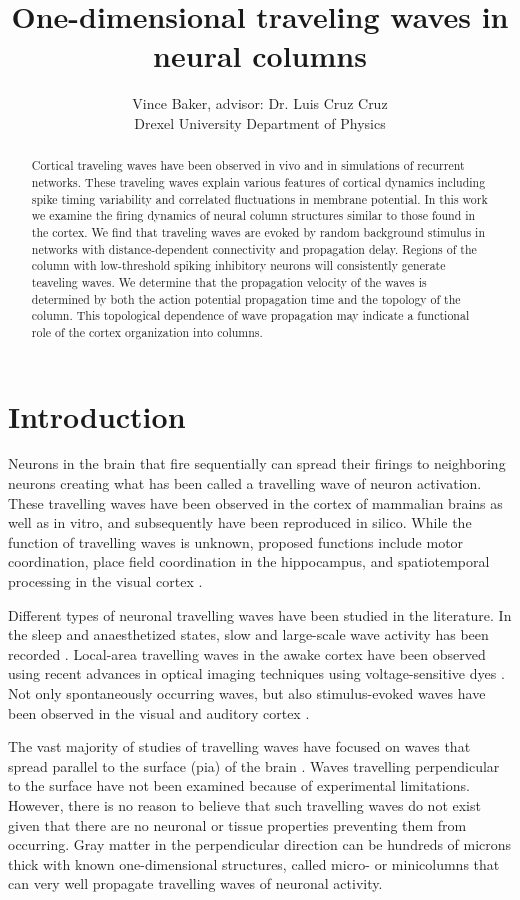 \documentclass[a4paper,11pt]{article}
\title{One-dimensional traveling waves in neural columns}
\author{Vince Baker, advisor: Dr. Luis Cruz Cruz\\ Drexel University Department of Physics}
\begin{document}
\maketitle

\begin{abstract}
Cortical traveling waves have been observed in vivo and in simulations of recurrent networks.
These traveling waves explain various features of cortical dynamics including spike timing variability and correlated fluctuations in membrane potential.
In this work we examine the firing dynamics of neural column structures similar to those found in the cortex.
We find that traveling waves are evoked by random background stimulus in networks with distance-dependent connectivity and propagation delay.
Regions of the column with low-threshold spiking inhibitory neurons will consistently generate teaveling waves.
We determine that the propagation velocity of the waves is determined by both the action potential propagation time and the topology of the column.
This topological dependence of wave propagation may indicate a functional role of the cortex organization into columns.

\end{abstract}

\section{Introduction} 
Neurons in the brain that fire sequentially can spread their firings to neighboring neurons creating what has been called a travelling wave of neuron activation. 
These travelling waves have been observed in the cortex of mammalian brains as well as in vitro, and subsequently have been reproduced in silico. 
While the function of travelling waves is unknown, proposed functions include motor coordination, place field coordination in the hippocampus, and spatiotemporal processing in the visual cortex \cite{muller2018}. 

Different types of neuronal travelling waves have been studied in the literature. 
In the sleep and anaesthetized states, slow and large-scale wave activity has been recorded \cite{muller2018}. 
Local-area travelling waves in the awake cortex have been observed using recent advances in optical imaging techniques using voltage-sensitive dyes \cite{wu2008}. 
Not only spontaneously occurring waves, but also stimulus-evoked waves have been observed in the visual and auditory cortex \cite{reimer2010}\cite{muller2018}.

The vast majority of studies of travelling waves have focused on waves that spread parallel to the surface (pia) of the brain \cite{muller2018}. 
Waves travelling perpendicular to the surface have not been examined because of experimental limitations. 
However, there is no reason to believe that such travelling waves do not exist given that there are no neuronal or tissue properties preventing them from occurring. 
Gray matter in the perpendicular direction can be hundreds of microns thick with known one-dimensional structures, called micro- or minicolumns\cite{cruz2000} that can very well propagate travelling waves of neuronal activity.
\end{document}
